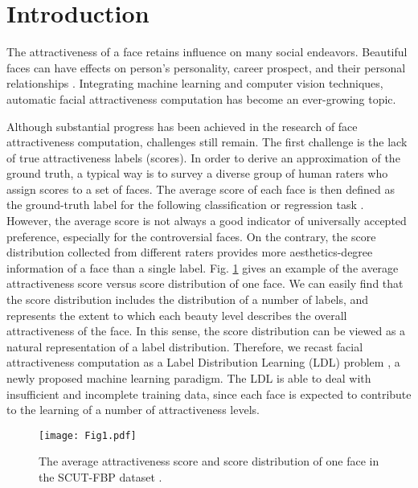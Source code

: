 \documentclass[preprint,5p,times,twocolumn]{elsarticle}
\begin{document}
\section{Introduction}
The attractiveness of a face retains influence on many social endeavors. Beautiful faces can have effects on person's personality, career prospect, and their personal relationships \cite{OHFP11_Calder}. Integrating machine learning and computer vision techniques, automatic facial attractiveness computation has become an ever-growing topic.

Although substantial progress has been achieved in the research of face attractiveness computation, challenges still remain. The first challenge is the lack of true attractiveness labels (scores). In order to derive an approximation of the ground truth, a typical way is to survey a diverse group of human raters who assign scores to a set of faces. The average score of each face is then defined as the ground-truth label for the following classification or regression task \cite{myMTAP}. However, the average score is not always a good indicator of universally accepted preference, especially for the controversial faces. On the contrary, the score distribution collected from different raters provides more aesthetics-degree information of a face than a single label. Fig. \ref{fig1} gives an example of the average attractiveness score versus score distribution of one face. We can easily find that the score distribution includes the distribution of a number of labels, and represents the extent to which each beauty level describes the overall attractiveness of the face. In this sense, the score distribution can be viewed as a natural representation of a label distribution. Therefore, we recast facial attractiveness computation as a Label Distribution Learning (LDL) problem \cite{PAMI13_Geng}, a newly proposed machine learning paradigm. The LDL is able to deal with insufficient and incomplete training data, since each face is expected to contribute to the learning of a number of attractiveness levels.

\begin{figure}[!h]
\centering
\texttt{[image: Fig1.pdf]}
\caption{The average attractiveness score and score distribution of one face in the SCUT-FBP dataset \cite{SMC15_Xie}.}
\label{fig1}
\end{figure}
\end{document}
